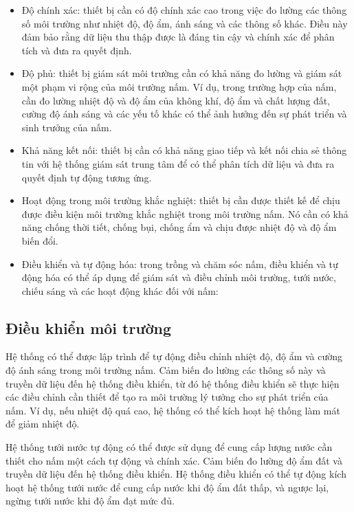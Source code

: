 \begin{itemize}
	\item Độ chính xác: thiết bị cần có độ chính xác cao trong việc đo lường các thông số môi trường như nhiệt độ, độ ẩm, ánh sáng và các thông số khác. Điều này đảm bảo rằng dữ liệu thu thập được là đáng tin cậy và chính xác để phân tích và đưa ra quyết định.
	\item Độ phủ: thiết bị giám sát môi trường cần có khả năng đo lường và giám sát một phạm vi rộng của môi trường nấm. Ví dụ, trong trường hợp của nấm, cần đo lường nhiệt độ và độ ẩm của không khí, độ ẩm và chất lượng đất, cường độ ánh sáng và các yếu tố khác có thể ảnh hưởng đến sự phát triển và sinh trưởng của nấm.
	\item Khả năng kết nối: thiết bị cần có khả năng giao tiếp và kết nối chia sẻ thông tin với hệ thống giám sát trung tâm để có thể phân tích dữ liệu và đưa ra quyết định tự động tương ứng.
	\item Hoạt động trong môi trường khắc nghiệt: thiết bị cần được thiết kế để chịu được điều kiện môi trường khắc nghiệt trong môi trường nấm. Nó cần có khả năng chống thời tiết, chống bụi, chống ẩm và chịu được nhiệt độ và độ ẩm biến đổi.
	\item Điều khiển và tự động hóa: trong trồng và chăm sóc nấm, điều khiển và tự động hóa có thể áp dụng để giám sát và điều chỉnh môi trường, tưới nước, chiếu sáng và các hoạt động khác đối với nấm:
\end{itemize}

\subsection{Điều khiển môi trường}

Hệ thống có thể được lập trình để tự động điều chỉnh nhiệt độ, độ ẩm và cường độ ánh sáng trong môi trường nấm. Cảm biến đo lường các thông số này và truyền dữ liệu đến hệ thống điều khiển, từ đó hệ thống điều khiển sẽ thực hiện các điều chỉnh cần thiết để tạo ra môi trường lý tưởng cho sự phát triển của nấm. Ví dụ, nếu nhiệt độ quá cao, hệ thống có thể kích hoạt hệ thống làm mát để giảm nhiệt độ.

Hệ thống tưới nước tự động có thể được sử dụng để cung cấp lượng nước cần thiết cho nấm một cách tự động và chính xác. Cảm biến đo lường độ ẩm đất và truyền dữ liệu đến hệ thống điều khiển. Hệ thống điều khiển có thể tự động kích hoạt hệ thống tưới nước để cung cấp nước khi độ ẩm đất thấp, và ngược lại, ngừng tưới nước khi độ ẩm đạt mức đủ.

